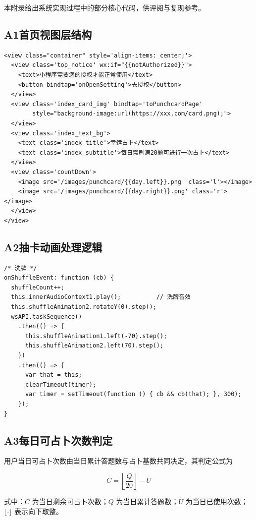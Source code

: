 
\begin{theappendix}

本附录给出系统实现过程中的部分核心代码，供评阅与复现参考。

\subsection*{A1\quad 首页视图层结构}

\begin{lstlisting}[style=xml, caption={首页视图层 index.wxml}]
<view class="container" style='align-items: center;'>
  <view class='top_notice' wx:if="{{notAuthorized}}">
    <text>小程序需要您的授权才能正常使用</text>
    <button bindtap='onOpenSetting'>去授权</button>
  </view>
  <view class='index_card_img' bindtap='toPunchcardPage'
        style="background-image:url(https://xxx.com/card.png);">
  </view>
  <view class='index_text_bg'>
    <text class='index_title'>幸运占卜</text>
    <text class='index_subtitle'>每日需刷满20题可进行一次占卜</text>
  </view>
  <view class='countDown'>
    <image src='/images/punchcard/{{day.left}}.png' class='l'></image>
    <image src='/images/punchcard/{{day.right}}.png' class='r'></image>
  </view>
</view>
\end{lstlisting}

\subsection*{A2\quad 抽卡动画处理逻辑}

\begin{lstlisting}[style=js, caption={洗牌动画 onShuffleEvent}]
/* 洗牌 */
onShuffleEvent: function (cb) {
  shuffleCount++;
  this.innerAudioContext1.play();          // 洗牌音效
  this.shuffleAnimation2.rotateY(0).step();
  wsAPI.taskSequence()
    .then(() => {
      this.shuffleAnimation1.left(-70).step();
      this.shuffleAnimation2.left(70).step();
    })
    .then(() => {
      var that = this;
      clearTimeout(timer);
      var timer = setTimeout(function () { cb && cb(that); }, 300);
    });
}
\end{lstlisting}

\subsection*{A3\quad 每日可占卜次数判定}

用户当日可占卜次数由当日累计答题数与占卜基数共同决定，其判定公式为

\begin{equation}
  C = \left\lfloor \frac{Q}{20} \right\rfloor - U
  \label{equ:appendix-count}
\end{equation}

式中：$C$ 为当日剩余可占卜次数；$Q$ 为当日累计答题数；$U$ 为当日已使用次数；$\lfloor \cdot \rfloor$ 表示向下取整。

\end{theappendix}
